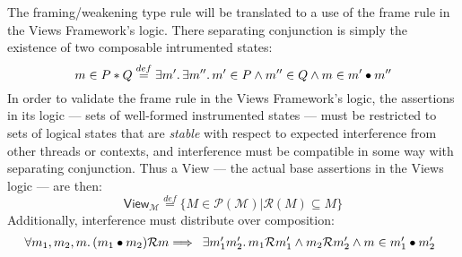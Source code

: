 


The framing/weakening type rule will be translated to a use of the frame rule in the Views Framework's logic.  There separating conjunction is simply the existence of two composable intrumented states:
\[ m \in P \ast Q   \stackrel{def}{=} \exists m' \ldotp \exists m'' \ldotp m' \in P \land m'' \in Q \land m \in m' \bullet m''\]
In order to validate the frame rule in the Views Framework's logic, the assertions in its logic --- sets of well-formed instrumented states --- must be restricted to sets of logical states that are \emph{stable} with respect to expected interference from other threads or contexts, and interference must be compatible in some way with separating conjunction.
Thus a \textsf{View} --- the actual base assertions in the Views logic --- are then:
\[\textsf{View}_{\mathcal{M}} \stackrel{def}{=} \{ M \in \mathcal{P}(\mathcal{M}) | \mathcal{R}(M) \subseteq M\}\]
Additionally, interference must distribute over composition:
\[ \forall m_{1}, m_{2}, m\ldotp (m_{1} \bullet  m_{2})\mathcal{R}m \Longrightarrow \begin{array}{ll}  \exists  m'_{1} m'_{2} \ldotp m_{1} \mathcal{R} m'_{1} \land m_{2} \mathcal{R} m'_{2} \land  m \in m'_{1} \bullet m'_{2} \end{array}\]


